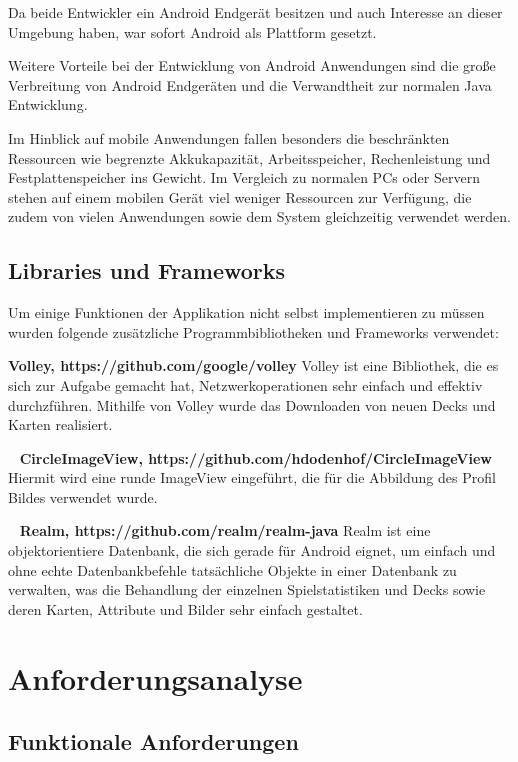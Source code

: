 \documentclass{scrartcl}
\begin{document}
Da beide Entwickler ein Android Endgerät besitzen und auch Interesse an dieser Umgebung haben, war sofort Android als Plattform gesetzt.
 
Weitere Vorteile bei der Entwicklung von Android Anwendungen sind die große Verbreitung von Android Endgeräten und die Verwandtheit zur normalen Java Entwicklung.

Im Hinblick auf mobile Anwendungen fallen besonders die beschränkten Ressourcen wie begrenzte Akkukapazität, Arbeitsspeicher, Rechenleistung und Festplattenspeicher ins Gewicht.
Im Vergleich zu normalen PCs oder Servern stehen auf einem mobilen Gerät viel weniger Ressourcen zur Verfügung, die zudem von vielen Anwendungen sowie dem System gleichzeitig verwendet werden.

\subsection{Libraries und Frameworks}
Um einige Funktionen der Applikation nicht selbst implementieren zu müssen
wurden folgende zusätzliche Programmbibliotheken und Frameworks verwendet:

\noindent
\textbf{Volley, https://github.com/google/volley} \newline
Volley ist eine Bibliothek, die es sich zur Aufgabe gemacht hat, Netzwerkoperationen sehr einfach und effektiv durchzführen.
Mithilfe von Volley wurde das Downloaden von neuen Decks und Karten realisiert.

\ \newline
\textbf{CircleImageView, https://github.com/hdodenhof/CircleImageView} \newline
Hiermit wird eine runde ImageView eingeführt, die für die Abbildung des Profil Bildes verwendet wurde.

\ \newline
\textbf{Realm, https://github.com/realm/realm-java} \newline
Realm ist eine objektorientiere Datenbank, die sich gerade für Android eignet, um einfach und ohne echte Datenbankbefehle tatsächliche Objekte in einer Datenbank zu verwalten, was die Behandlung der einzelnen Spielstatistiken und Decks sowie deren Karten, Attribute und Bilder sehr einfach gestaltet. 


\section{Anforderungsanalyse}
\subsection{Funktionale Anforderungen}
\end{document}

